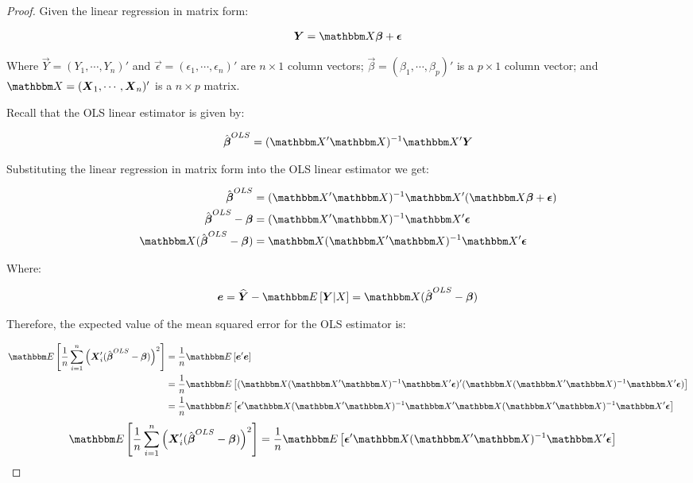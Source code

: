 \begin{proof}

Given the linear regression in matrix form:

\begin{align*}
    \Vec{Y} = \Mat{X}\Vec{\beta} + \Vec{\epsilon}
\end{align*}

Where $\Vec{Y} = (Y_1, \cdots, Y_n)'$ and $\Vec{\epsilon} = (\epsilon_1, \cdots, \epsilon_n)'$ are $n \times 1$ column vectors; $\Vec{\beta} = (\beta_1, \cdots, \beta_p)'$ is a $p \times 1$ column vector; and $\Mat{X} = (\Vec{X}_1, \cdots, \Vec{X}_n)'$ is a $n \times p$ matrix.

Recall that the OLS linear estimator is given by:

\begin{align*}
    \hat{\Vec{\beta}}^{OLS} = (\Mat{X}'\Mat{X})^{-1}\Mat{X}'\Vec{Y}
\end{align*}

Substituting the linear regression in matrix form into the OLS linear estimator we get:

\begin{align*}
    \hat{\Vec{\beta}}^{OLS} &= (\Mat{X}'\Mat{X})^{-1}\Mat{X}'(\Mat{X}\Vec{\beta} + \Vec{\epsilon}) \\
    \hat{\Vec{\beta}}^{OLS} - \Vec{\beta} &= (\Mat{X}'\Mat{X})^{-1}\Mat{X}'\Vec{\epsilon} \\
    \Mat{X}(\hat{\Vec{\beta}}^{OLS} - \Vec{\beta}) &= \Mat{X}(\Mat{X}'\Mat{X})^{-1}\Mat{X}'\Vec{\epsilon} \\
\end{align*}

Where: 

\begin{align*}
    \Vec{e} = \widehat{\Vec{Y}} - \E{\Vec{Y} | X} = \Mat{X}(\hat{\Vec{\beta}}^{OLS} - \Vec{\beta}) 
\end{align*}

Therefore, the expected value of the mean squared error for the OLS estimator is:

\begin{align*}
\E{
    \frac{1}{n}
    \sum_{i=1}^{n} \left(\Vec{X}_i' 
        (\hat{\Vec{\beta}}^{OLS} - \Vec{\beta})
    \right)^2
}
&=
\frac{1}{n} \E{
    \Vec{e}'\Vec{e}
}\\
&= \frac{1}{n} \E{
    (\Mat{X}(\Mat{X}'\Mat{X})^{-1}\Mat{X}'\Vec{\epsilon})'(\Mat{X}(\Mat{X}'\Mat{X})^{-1}\Mat{X}'\Vec{\epsilon})
}\\
&= \frac{1}{n} \E{
    \Vec{\epsilon}'\Mat{X}(\Mat{X}'\Mat{X})^{-1}\Mat{X}'\Mat{X}(\Mat{X}'\Mat{X})^{-1}\Mat{X}'\Vec{\epsilon}
}\\
\end{align*}
\begin{align}
\E{
    \frac{1}{n}
    \sum_{i=1}^{n} \left(\Vec{X}_i' 
        (\hat{\Vec{\beta}}^{OLS} - \Vec{\beta})
    \right)^2
}
&= \frac{1}{n} \E{
    \Vec{\epsilon}'\Mat{X}(\Mat{X}'\Mat{X})^{-1}\Mat{X}'\Vec{\epsilon}
}
\label{eq:expected-value-mse}
\end{align}


\end{proof}
